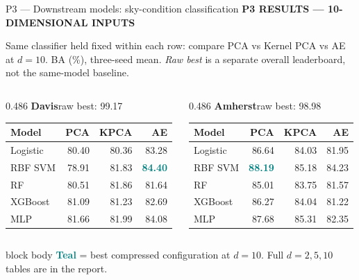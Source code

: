 \documentclass[aspectratio=169,11pt]{beamer}
\newcommand{\sectiontag}[1]{{\footnotesize\usebeamercolor[fg]{structure}\textbf{#1}}\par\vspace{0.10cm}}
\newcommand{\smallmuted}[1]{{\footnotesize\color{slate}#1\par}}
\begin{document}
\begin{frame}{P3 — Downstream models: sky-condition classification}
\sectiontag{P3 \quad RESULTS — 10-DIMENSIONAL INPUTS}
\smallmuted{Same classifier held fixed within each row: compare PCA vs Kernel PCA vs AE at $d=10$. BA (\%), three-seed mean. \emph{Raw best} is a separate overall leaderboard, not the same-model baseline.}\vspace{0.18cm}
\begin{columns}[T,onlytextwidth]
\begin{column}{0.486\textwidth}
\textbf{Davis}\hfill{\scriptsize raw best: 99.17}\par\vspace{0.12cm}
{\fontsize{8.8}{10.4}\selectfont
\setlength{\tabcolsep}{3.9pt}
\renewcommand{\arraystretch}{1.39}
\begin{tabular}{@{}lrrr@{}}\toprule
\textbf{Model} & \textbf{PCA} & \textbf{KPCA} & \textbf{AE}\\\midrule
Logistic & 80.40 & 80.36 & 83.28\\
RBF SVM & 78.91 & 81.83 & \textcolor{teal}{\textbf{84.40}}\\
RF & 80.51 & 81.86 & 81.64\\
XGBoost & 81.09 & 81.23 & 82.69\\
MLP & 81.66 & 81.99 & 84.08\\
\bottomrule\end{tabular}}
\end{column}
\begin{column}{0.486\textwidth}
\textbf{Amherst}\hfill{\scriptsize raw best: 98.98}\par\vspace{0.12cm}
{\fontsize{8.8}{10.4}\selectfont
\setlength{\tabcolsep}{3.9pt}
\renewcommand{\arraystretch}{1.39}
\begin{tabular}{@{}lrrr@{}}\toprule
\textbf{Model} & \textbf{PCA} & \textbf{KPCA} & \textbf{AE}\\\midrule
Logistic & 86.64 & 84.03 & 81.95\\
RBF SVM & \textcolor{teal}{\textbf{88.19}} & 85.18 & 84.23\\
RF & 85.01 & 83.75 & 81.57\\
XGBoost & 86.27 & 84.04 & 81.22\\
MLP & 87.68 & 85.31 & 82.35\\
\bottomrule\end{tabular}}
\end{column}
\end{columns}
\vspace{0.30cm}
\begin{beamercolorbox}[wd=\linewidth,sep=0.14cm]{block body}
\footnotesize \textcolor{teal}{\textbf{Teal}} = best compressed configuration at $d=10$. Full $d=2,5,10$ tables are in the report.
\end{beamercolorbox}
\end{frame}
\end{document}

